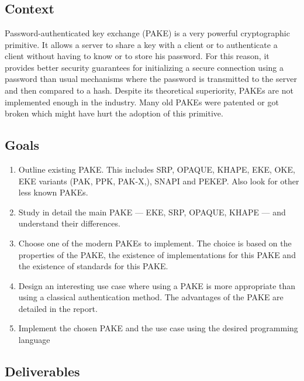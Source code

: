 \documentclass[../report.tex]{subfiles}
\begin{document}
\chapter{}



\section*{Context}

Password-authenticated key exchange (PAKE) is a very powerful cryptographic primitive. It allows a server to share a key with a client or to authenticate a client without having to know or to store his password.
For this reason, it provides better security guarantees for initializing a secure connection using a password than usual mechanisms where the password is transmitted to the server and then compared to a hash.
Despite its theoretical superiority, PAKEs are not implemented enough in the industry. Many old PAKEs were patented or got broken which might have hurt the adoption of this primitive.



\section*{Goals}

\begin{enumerate}
 \item Outline existing PAKE. This includes SRP, OPAQUE, KHAPE, EKE, OKE, EKE variants (PAK, PPK, PAK-X,), SNAPI and PEKEP. Also look for other less known PAKEs.
 \item Study in detail the main PAKE --- EKE, SRP, OPAQUE, KHAPE --- and understand their differences.
 \item Choose one of the modern PAKEs to implement. The choice is based on the properties of the PAKE, the existence of implementations for this PAKE and the existence of standards for this PAKE.
 \item Design an interesting use case where using a PAKE is more appropriate than using a classical authentication method. The advantages of the PAKE are detailed in the report.
 \item Implement the chosen PAKE and the use case using the desired programming language
\end{enumerate}



\section*{Deliverables}
\end{document}
